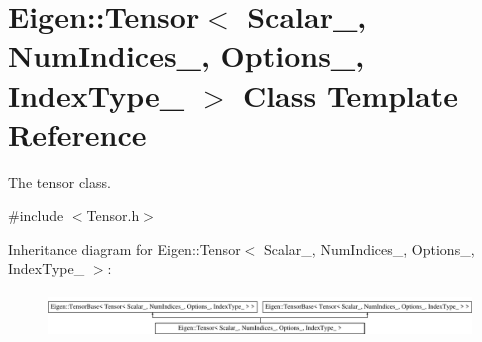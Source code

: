 \hypertarget{class_eigen_1_1_tensor}{}\section{Eigen\+:\+:Tensor$<$ Scalar\+\_\+, Num\+Indices\+\_\+, Options\+\_\+, Index\+Type\+\_\+ $>$ Class Template Reference}
\label{class_eigen_1_1_tensor}


The tensor class.  




{\ttfamily \#include $<$Tensor.\+h$>$}

Inheritance diagram for Eigen\+:\+:Tensor$<$ Scalar\+\_\+, Num\+Indices\+\_\+, Options\+\_\+, Index\+Type\+\_\+ $>$\+:\begin{figure}[H]
\begin{center}
\leavevmode
\includegraphics[height=1.191489cm]{class_eigen_1_1_tensor}
\end{center}
\end{figure}
